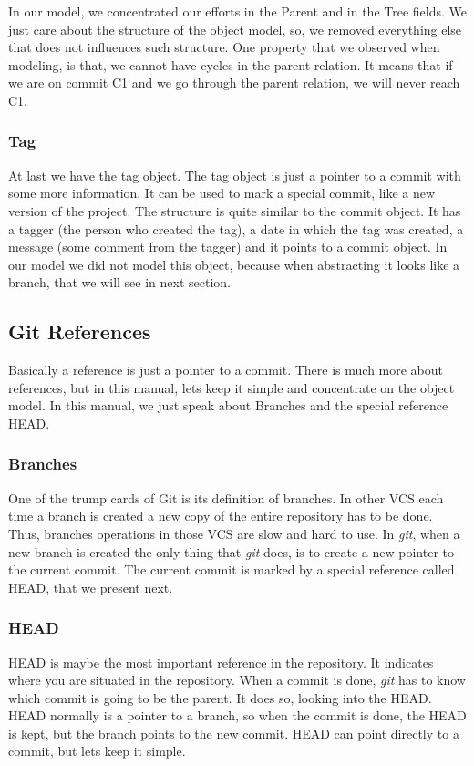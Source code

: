 In our model, we concentrated our efforts in the Parent and in the
Tree fields. We just care about the structure of the object model, so,
we removed everything else that does not influences such
structure. One property that we observed when modeling, is that, we
cannot have cycles in the parent relation. It means that if we are
on commit C1 and we go through the parent relation, we will never
reach C1.

\subsubsection{Tag}
At last we have the tag object. The tag object is just a pointer to
a commit with some more information. It can be used to mark a special 
commit, like a new version of the project. The structure is quite 
similar to the commit object. It has a tagger (the person who created 
the tag), a date in which the tag was created, a message (some
comment from the tagger) and it points to a commit object. In our
model we did not model this object, because when abstracting it looks
like a branch, that we will see in next section.

\subsection{Git References}
Basically a reference is just a pointer to a commit. There is much
more about references, but in this manual, lets keep it simple and
concentrate on the object model. In this manual, we just speak about
Branches and the special reference HEAD.

\subsubsection{Branches}
One of the trump cards of Git is its definition of branches. In other
VCS each time a branch is created a new copy of the entire repository
has to be done. Thus, branches operations in those VCS are slow and hard to use. 
In \emph{git}, when a new branch is created the only thing that
\emph{git} does, is to create a new pointer to the current
commit. The current commit is marked by a special reference called
HEAD, that we present next.

\subsubsection{HEAD}
HEAD is maybe the most important reference in the repository. It
indicates where you are situated in the repository. When a commit is
done, \emph{git} has to know which commit is going to be the parent. 
It does so, looking into the HEAD. HEAD normally is a
pointer to a branch, so when the commit is done, the HEAD is kept, but
the branch points to the new commit. HEAD can point directly to a
commit, but lets keep it simple.


